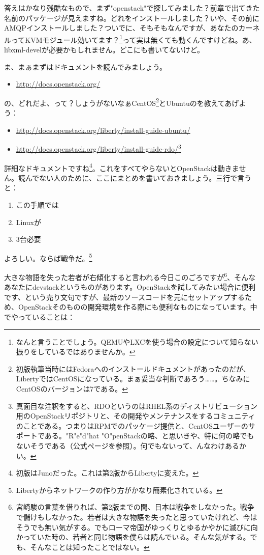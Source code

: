 \documentclass[9pt,b5paper,tombo,openany,dvipdfmx]{jsbook}
\begin{document}
答えはかなり残酷なもので、まず"openstack"で探してみました？前章で出てきた名前のパッケージが見えますね。どれをインストールしました？いや、その前にAMQPインストールしました？ついでに、そもそもなんですが、あなたのカーネルってKVMモジュール効いてます？\footnote{なんと言うことでしょう。QEMUやLXCを使う場合の設定について知らない振りをしているではありませんか。}って実は無くても動くんですけどね。あ、libxml-develが必要かもしれません。どこにも書いてないけど。

ま、まぁまずはドキュメントを読んでみましょう。

\begin{itemize}
	\item \url{http://docs.openstack.org/}
\end{itemize}

の、どれだよ、って？しょうがないなぁCentOS\footnote{初版執筆当時にはFedoraへのインストールドキュメントがあったのだが、LibertyではCentOSになっている。まぁ妥当な判断であろう……。ちなみにCentOSのバージョンは7である。}とUbuntuのを教えてあげよう：

\begin{itemize}
	\item \url{http://docs.openstack.org/liberty/install-guide-ubuntu/}
	\item \url{http://docs.openstack.org/liberty/install-guide-rdo/}\footnote{真面目な注釈をすると、RDOというのはRHEL系のディストリビューション用のOpenStackリポジトリと、その開発やメンテナンスをするコミュニティのことである。つまりはRPMでのパッケージ提供と、CentOSユーザーのサポートである。"R"e"d"hat "O"penStackの略、と思いきや、特に何の略でもないそうである（公式ページを参照）。何でもないって、んなわけあるかい。}
\end{itemize}

詳細なドキュメントですね\footnote{初版はJunoだった。これは第2版からLibertyに変えた。}。これをすべてやらないとOpenStackは動きません。読んでない人のために、ここにまとめを書いておきましょう。三行で言うと：

\begin{enumerate}
	\item この手順では
	\item Linuxが
	\item 3台必要
\end{enumerate}

よろしい。ならば戦争だ。\footnote{Libertyからネットワークの作り方がかなり簡素化されている。}

大きな物語を失った若者が右傾化すると言われる今日このごろですが\footnote{宮崎駿の言葉を借りれば、第2版までの間、日本は戦争をしなかった。戦争で儲けもしなかった。若者は大きな物語を失ったと思っていたけれど、今はそうでも無い気がする。でもローマ帝国がゆっくりとゆるかやかに滅びに向かっていた時の、若者と同じ物語を僕らは読んでいる。そんな気がする。でも、そんなことは知ったことではない。}、そんなあなたにdevstackというものがあります。OpenStackを試してみたい場合に便利です、という売り文句ですが、最新のソースコードを元にセットアップするため、OpenStackそのものの開発環境を作る際にも便利なものになっています。中でやっていることは：
\end{document}

